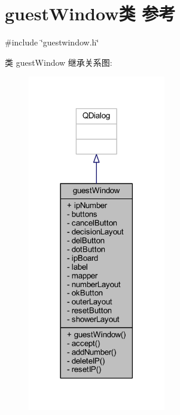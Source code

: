 \hypertarget{classguest_window}{}\section{guest\+Window类 参考}
\label{classguest_window}


{\ttfamily \#include \char`\"{}guestwindow.\+h\char`\"{}}



类 guest\+Window 继承关系图\+:
\nopagebreak
\begin{figure}[H]
\begin{center}
\leavevmode
\includegraphics[width=170pt]{d5/dd1/classguest_window__inherit__graph}
\end{center}
\end{figure}


